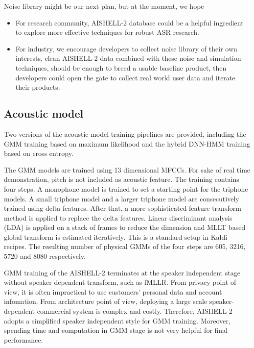 \documentclass[a4paper]{article}
\begin{document}
\begin{itemize}
  Noise library might be our next plan, but at the moment, we hope
  \begin{itemize}
    \item For research community, AISHELL-2 database could be a helpful
      ingredient to explore more effective techniques for robust ASR research.
    \item For industry, we encourage developers to collect noise library of
      their own interests, clean AISHELL-2 data combined with these noise and
      simulation techniques, should be enough to breed a usable baseline
      product, then developers could open the gate to collect real world user
      data and iterate their products.
  \end{itemize}
\end{itemize}

\subsection{Acoustic model}

Two versions of the acoustic model training pipelines are provided, including
the GMM training based on maximum likelihood and the hybrid DNN-HMM training
based on cross entropy.

The GMM models are trained using 13 dimensional MFCCs. For sake of real time
demonstration, pitch is not included as acoustic feature. The training contains
four steps. A monophone model is trained to set a starting point for the
triphone models. A small triphone model and a larger triphone model are
consecutively trained using delta features. After that, a more sophisticated
feature transform method is applied to replace the delta features. Linear
discriminant analysis (LDA) is applied on a stack of frames to reduce the
dimension and MLLT based global transform is estimated iteratively. This is a
standard setup in Kaldi recipes. The resulting number of physical GMMs of the
four steps are 605, 3216, 5720 and 8080 respectively.

GMM training of the AISHELL-2 terminates at the speaker independent stage
without speaker dependent transform, such as fMLLR. From privacy point of view,
it is often impractical to use customers' personal data and account
infomation. From architecture point of view, deploying a large scale
speaker-dependent commercial system is complex and costly. Therefore, AISHELL-2
adopts a simplified speaker independent style for GMM training. Moreover,
spending time and computation in GMM stage is not very helpful for final
performance.
\end{document}
